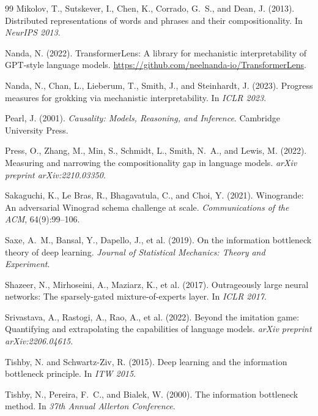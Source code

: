 \documentclass{article}
\begin{document}
\begin{thebibliography}{99}
Mikolov, T., Sutskever, I., Chen, K., Corrado, G.~S., and Dean, J. (2013).
Distributed representations of words and phrases and their compositionality.
In \emph{NeurIPS 2013}.

Nanda, N. (2022).
TransformerLens: A library for mechanistic interpretability of GPT-style language models.
\url{https://github.com/neelnanda-io/TransformerLens}.

Nanda, N., Chan, L., Lieberum, T., Smith, J., and Steinhardt, J. (2023).
Progress measures for grokking via mechanistic interpretability.
In \emph{ICLR 2023}.

Pearl, J. (2001).
\emph{Causality: Models, Reasoning, and Inference}.
Cambridge University Press.

Press, O., Zhang, M., Min, S., Schmidt, L., Smith, N.~A., and Lewis, M. (2022).
Measuring and narrowing the compositionality gap in language models.
\emph{arXiv preprint arXiv:2210.03350}.

Sakaguchi, K., Le Bras, R., Bhagavatula, C., and Choi, Y. (2021).
Winogrande: An adversarial Winograd schema challenge at scale.
\emph{Communications of the ACM}, 64(9):99--106.

Saxe, A.~M., Bansal, Y., Dapello, J., et al. (2019).
On the information bottleneck theory of deep learning.
\emph{Journal of Statistical Mechanics: Theory and Experiment}.

Shazeer, N., Mirhoseini, A., Maziarz, K., et al. (2017).
Outrageously large neural networks: The sparsely-gated mixture-of-experts layer.
In \emph{ICLR 2017}.

Srivastava, A., Rastogi, A., Rao, A., et al. (2022).
Beyond the imitation game: Quantifying and extrapolating the capabilities of language models.
\emph{arXiv preprint arXiv:2206.04615}.

Tishby, N. and Schwartz-Ziv, R. (2015).
Deep learning and the information bottleneck principle.
In \emph{ITW 2015}.

Tishby, N., Pereira, F.~C., and Bialek, W. (2000).
The information bottleneck method.
In \emph{37th Annual Allerton Conference}.


\end{thebibliography}
\end{document}
